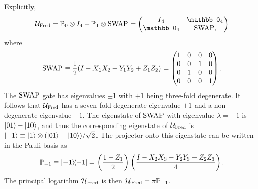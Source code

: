 Explicitly,
\begin{equation}
    \UFred = \PP_0 \otimes I_4 + \PP_1 \otimes \on{SWAP} =
    \begin{pmatrix}
        I_4 & \mathbb0_4 \\
        \mathbb0_4 & \on{SWAP},
    \end{pmatrix}
\end{equation}
where
\begin{equation}
    \operatorname{SWAP} \equiv
    \frac{1}{2}(I + X_1 X_2 + Y_1 Y_2 + Z_1 Z_2) =
    \begin{pmatrix}
        1 & 0 & 0 & 0 \\
        0 & 0 & 1 & 0 \\
        0 & 1 & 0 & 0 \\
        0 & 0 & 0 & 1
    \end{pmatrix}.
\end{equation}
The $\operatorname{SWAP}$ gate has eigenvalues $\pm1$ with $+1$ being three-fold degenerate.
It follows that ${\mathcal{U}}_{\operatorname{Fred}}$ has a seven-fold degenerate eigenvalue $+1$ and a non-degenerate eigenvalue $-1$.
The eigenstate of $\operatorname{SWAP}$ with eigenvalue $\lambda=-1$ is $\ket{01}-\ket{10}$, and thus the corresponding eigenstate of ${\mathcal{U}}_{\operatorname{Fred}}$ is $\ket{-1}\equiv\ket1\otimes(\ket{01}-\ket{10})/\sqrt2$.
The projector onto this eigenstate can be written in the Pauli basis as
\begin{equation}
    \mathbb{P}_{-1}\equiv \ketbra{-1} =
    \left(\frac{1-Z_1}{2}\right)
    \left(\frac{I - X_2 X_3 - Y_2 Y_3 - Z_2 Z_3}{4}\right).
    \label{eq:fredkin_projector_negeigspace}
\end{equation}
The principal logarithm ${\mathcal{H}}_{\operatorname{Fred}}$ is then
${\mathcal{H}}_{\operatorname{Fred}} = \pi\mathbb{P}_{-1}$.

